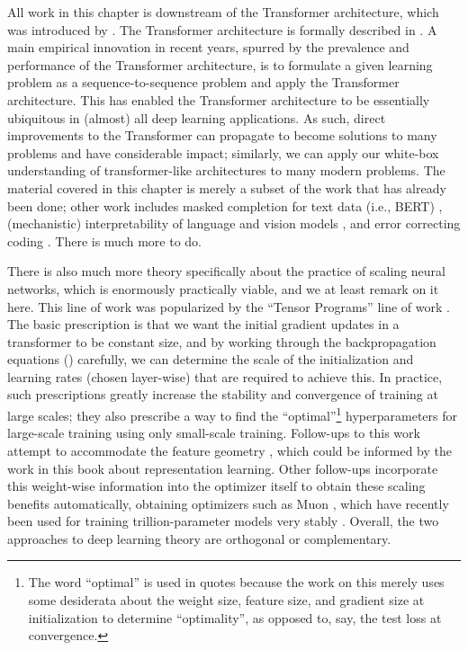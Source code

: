 \documentclass[../../book-main.tex]{subfiles}
\begin{document}
All work in this chapter is downstream of the Transformer
architecture, which was introduced by \citet{vaswani2017attention}.
The Transformer architecture is formally described in
. A main empirical innovation in
recent years, spurred by the prevalence and performance of the
Transformer architecture, is to formulate a given learning problem as
a sequence-to-sequence problem and apply the Transformer
architecture. This has enabled the Transformer architecture to be
essentially ubiquitous in (almost) all deep learning applications. As
such, direct improvements to the Transformer can propagate to become
solutions to many problems and have considerable impact; similarly,
we can apply our white-box understanding of transformer-like
architectures to many modern problems. The material covered in this
chapter is merely a subset of the work that has already been done;
other work includes masked completion for text data (i.e., BERT)
\citep{devlin2019bert,yu2024white}, (mechanistic) interpretability of
language and vision models \citep{bai2024improving}, and error
correcting coding \citep{zheng2025white}. There is much more to do.

There is also much more theory specifically about the practice of
scaling neural networks, which is enormously practically viable, and
we at least remark on it here. This line of work was popularized by
the ``Tensor Programs'' line of work \citep{yang2022tensor}. The
basic prescription is that we want the initial gradient updates in a
transformer to be constant size, and by working through the
backpropagation equations () carefully, we can
determine the scale of the initialization and learning rates (chosen
layer-wise) that are required to achieve this. In practice, such
prescriptions greatly increase the stability and convergence of
training at large scales; they also prescribe a way to find the
``optimal''\footnote{The word ``optimal'' is used in quotes because
the work on this merely uses some desiderata about the weight size,
feature size, and gradient size at initialization to determine
``optimality'', as opposed to, say, the test loss at convergence.}
hyperparameters for large-scale training using only small-scale
training. Follow-ups to this work attempt to accommodate the feature
geometry \citep{bernstein2024oldoptimizernewnorm}, which could be
informed by the work in this book about representation learning.
Other follow-ups incorporate this weight-wise information into the
optimizer itself to obtain these scaling benefits automatically,
obtaining optimizers such as Muon \citep{jordan6muon}, which have
recently been used for training trillion-parameter models very stably
\citep{moonshot2025kimi}. Overall, the two approaches to deep
learning theory are orthogonal or complementary.
\end{document}

